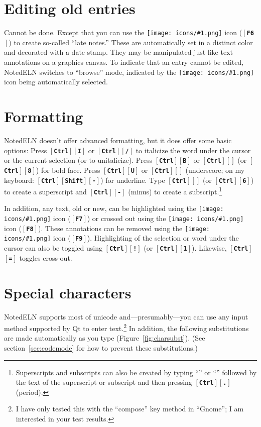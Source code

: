\documentclass[11pt]{report}
\def\keystroke#1{$\left[\right.\!${\tt\bfseries #1}$\!\left.\right]$}
\def\key#1{\keystroke{#1}}
\def\keycombo#1#2{\keystroke{#1}\keystroke{#2}}
\def\keycontrol#1{\keycombo{Ctrl}{#1}}
\def\controlshift#1{\keystroke{Ctrl}\keystroke{Shift}\keystroke{#1}}
\def\keyctrlhat{\keycontrol{\char94}}
\def\keyhat{``{\tt\char94}''}
\def\keyctrlunderscore{\keycontrol{\char95}}
\def\keyunderscore{``{\tt\char95}''}
\def\icon#1{\raise-2pt\hbox{\texttt{[image: icons/\#1.png]}}}
\begin{document}
\section{Editing old entries}

Cannot be done. Except that you can use the \icon{note} icon (\key{F6}) to
create so-called ``late notes.'' These are automatically set in a
distinct color and decorated with a date stamp. They
may be manipulated just like text annotations on a graphics canvas. To
indicate that an entry cannot be edited, NotedELN switches to ``browse''
mode, indicated by the \icon{browse} icon being automatically selected.

\section{Formatting}

NotedELN doesn't offer advanced formatting, but it does offer some basic
options: Press \keycontrol{I} or \keycontrol{/} to italicize the word
under the cursor or the current selection (or to unitalicize). Press
\keycontrol{B} or \keycontrol{*} (or \keycontrol{8}) for bold face. Press
\keycontrol{U} or \keyctrlunderscore{} (underscore; on my keyboard: \controlshift{-})
for underline. Type \keyctrlhat{} (or \keycontrol{6}) to create a
superscript and \keycontrol{-} (minus) to create a
subscript.\footnote{Superscripts and subscripts can also be created by
  typing \keyhat{} or \keyunderscore{} followed by the text of the
  superscript or subscript and then pressing \keycontrol{.} (period).}

In addition, any text, old or new, can be highlighted using the
\icon{highlight} icon (\key{F7}) or crossed out using the
\icon{strikeout} icon (\key{F8}). These
annotations can be removed using the \icon{plain} icon
(\key{F9}). Highlighting of the selection or word under the cursor can
also be toggled using \keycontrol{!} (or \keycontrol{1}). Likewise,
\keycontrol{=} toggles cross-out.

\section{Special characters}

NotedELN supports most of unicode and---presumably---you can use any input
method supported by Qt to enter text.\footnote{I have only tested this
  with the ``compose'' key method in ``Gnome''; I am interested in
  your test results.} In addition, the following substitutions are
made automatically as you type (Figure~\ref{fig:charsubst}). (See
section~\ref{sec:codemode} for how to prevent these substitutions.)
\end{document}
